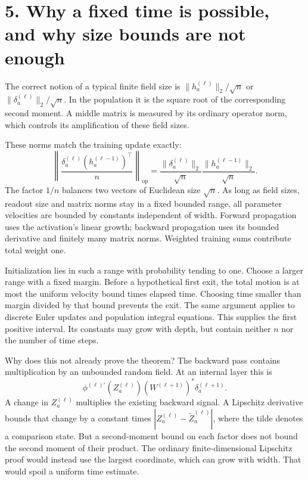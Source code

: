\newpage
\section*{5. Why a fixed time is possible, and why size bounds are not enough}

The correct notion of a typical finite field size is
$\|h_a^{(\ell)}\|_2/\sqrt n$ or $\|\delta_a^{(\ell)}\|_2/\sqrt n$.
In the population it is the square root of the corresponding second moment.
A middle matrix is measured by its ordinary operator norm, which controls
its amplification of these field sizes.

These norms match the training update exactly:
\[
\left\|\frac{\delta_a^{(\ell)}(h_a^{(\ell-1)})^\top}{n}
\right\|_{\operatorname{op}}
=\frac{\|\delta_a^{(\ell)}\|_2}{\sqrt n}
 \frac{\|h_a^{(\ell-1)}\|_2}{\sqrt n}.
\]
The factor $1/n$ balances two vectors of Euclidean size $\sqrt n$.
As long as field sizes, readout size and matrix norms stay in a fixed bounded
range, all parameter velocities are bounded by constants independent of
width. Forward propagation uses the activation's linear growth; backward
propagation uses its bounded derivative and finitely many matrix norms.
Weighted training sums contribute total weight one.

Initialization lies in such a range with probability tending to one. Choose
a larger range with a fixed margin. Before a hypothetical first exit, the
total motion is at most the uniform velocity bound times elapsed time.
Choosing time smaller than margin divided by that bound prevents the exit.
The same argument applies to discrete Euler updates and population integral
equations. This supplies the first positive interval. Its constants may grow
with depth, but contain neither $n$ nor the number of time steps.

Why does this not already prove the theorem? The backward pass contains
multiplication by an unbounded random field. At an internal layer this is
\[
\phi^{(\ell)\prime}(Z_a^{(\ell)})
       (W^{(\ell+1)})^*\delta_a^{(\ell+1)}.
\]
A change in $Z_a^{(\ell)}$ multiplies the existing backward signal. A
Lipschitz derivative bounds that change by a constant times
$|Z_a^{(\ell)}-\widetilde Z_a^{(\ell)}|$, where the tilde denotes a comparison
state. But a second-moment bound on each
factor does not bound the second moment of their product. The ordinary
finite-dimensional Lipschitz proof would instead use the largest coordinate,
which can grow with width. That would spoil a uniform time estimate.

